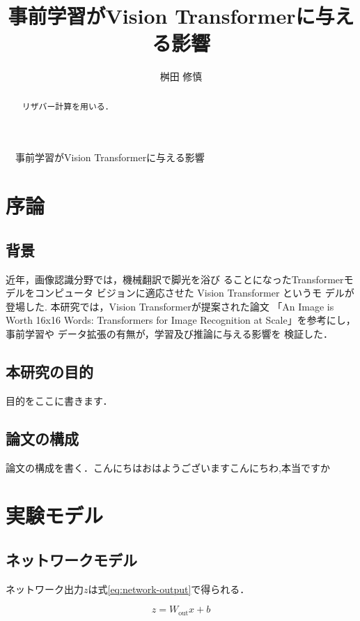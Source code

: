 \documentclass[a4paper, oneside, openany, dvipdfmx]{suribt}%
\title{事前学習がVision Transformerに与える影響}
\author{桝田 修慎}
\newcommand{\eref}[1]{式\eqref{#1}}
\begin{document}
\maketitle%
　事前学習がVision Transformerに与える影響

\frontmatter%
\begin{abstract}%
  リザバー計算\cite{jaeger2004harnessing,maass2002real}を用いる．
\end{abstract}

\tableofcontents%


\mainmatter%
\chapter{序論}
\section{背景}
近年，画像認識分野では，機械翻訳で脚光を浴び
ることになったTransformer\cite{dosovitskiy2021image}モデルをコンピュータ ビジョンに適応させた Vision Transformer というモ デルが登場した.
本研究では，Vision Transformerが提案された論文
「An Image is Worth 16x16 Words: Transformers for Image Recognition at Scale」を参考にし，事前学習や データ拡張の有無が，学習及び推論に与える影響を 検証した．
\section{本研究の目的}
目的をここに書きます．
\section{論文の構成}
論文の構成を書く．こんにちはおはようございますこんにちわ,本当ですか


\chapter{実験モデル}
\section{ネットワークモデル}
ネットワーク出力$z$は\eref{eq:network-output}で得られる．

\begin{equation}
  z = W_\mathrm{out} x + b
  \label{eq:network-output}
\end{equation}
\end{document}
